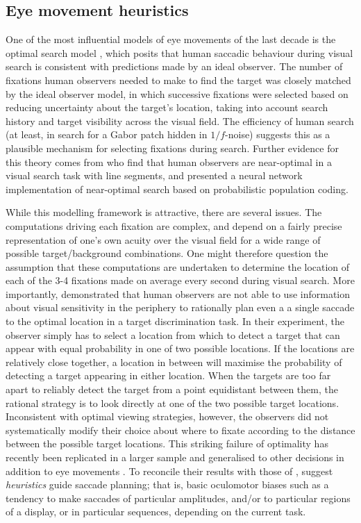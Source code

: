 \documentclass[a4paper, twocolumn, oneside, 10pt]{article}
\begin{document}
\subsection{Eye movement heuristics}

One of the most influential models of eye movements of the last decade is the optimal search model \citep{najemnik-geisler2008}, which posits that human saccadic behaviour during visual search is consistent with predictions made by an ideal observer. The number of fixations human observers needed to make to find the target was closely matched by the ideal observer model, in which successive fixations were selected based on reducing uncertainty about the target's location, taking into account search history and target visibility across the visual field. The efficiency of human search (at least, in search for a Gabor patch hidden in $1/f$-noise) suggests this as a plausible mechanism for selecting fixations during search. Further evidence for this theory comes from \cite{ma2011} who find that human observers are near-optimal in a visual search task with line segments, and presented a neural network implementation of near-optimal search based on probabilistic population coding.  

While this modelling framework is attractive, there are several issues. The computations driving each fixation are complex, and depend on a fairly precise representation of one's own acuity over the visual field for a wide range of possible target/background combinations. One might therefore question the assumption that these computations are undertaken to determine the location of each of the 3-4 fixations made on average every second during visual search. More importantly,  \cite{morvan-maloney2012} demonstrated that human observers are not able to use information about visual sensitivity in the periphery to rationally plan even a a single saccade to the optimal location in a target discrimination task. In their experiment, the observer simply has to select a location from which to detect a target that can appear with equal probability in one of two possible locations. If the locations are relatively close together, a location in between will maximise the probability of detecting a target appearing in either location. When the targets are too far apart to reliably detect the target from a point equidistant between them, the rational strategy is to look directly at one of the two possible target locations. Inconsistent with optimal viewing strategies, however, the observers did not systematically modify their choice about where to fixate according to the distance between the possible target locations. This striking failure of optimality has recently been replicated in a larger sample and generalised to other decisions in addition to eye movements  \citep{clarke-hunt2015}. To reconcile their results with those of  \cite{najemnik-geisler2008},  \cite{morvan-maloney2012} suggest \textit{heuristics} guide saccade planning; that is, basic oculomotor biases such as a tendency to make saccades of particular amplitudes, and/or to particular regions of a display, or in particular sequences, depending on the current task. 
\end{document}
